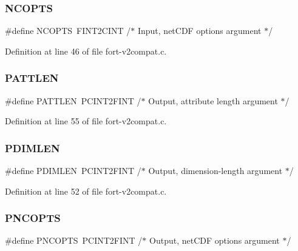\subsubsection{\texorpdfstring{N\+C\+O\+P\+TS}{NCOPTS}}
{\footnotesize\ttfamily \#define N\+C\+O\+P\+TS~F\+I\+N\+T2\+C\+I\+NT	/$\ast$ Input, net\+C\+DF options argument $\ast$/}



Definition at line 46 of file fort-\/v2compat.\+c.

\mbox{\label{fort-v2compat_8c_abba4da455082c98d8b81b6d70ff498de}} 
\subsubsection{\texorpdfstring{P\+A\+T\+T\+L\+EN}{PATTLEN}}
{\footnotesize\ttfamily \#define P\+A\+T\+T\+L\+EN~P\+C\+I\+N\+T2\+F\+I\+NT	/$\ast$ Output, attribute length argument $\ast$/}



Definition at line 55 of file fort-\/v2compat.\+c.

\mbox{\label{fort-v2compat_8c_a966419668dc6e6f3e34bc743e56397a6}} 
\subsubsection{\texorpdfstring{P\+D\+I\+M\+L\+EN}{PDIMLEN}}
{\footnotesize\ttfamily \#define P\+D\+I\+M\+L\+EN~P\+C\+I\+N\+T2\+F\+I\+NT	/$\ast$ Output, dimension-\/length argument $\ast$/}



Definition at line 52 of file fort-\/v2compat.\+c.

\mbox{\label{fort-v2compat_8c_ad28923cfdb7eaecc17fef3711c74befc}} 
\subsubsection{\texorpdfstring{P\+N\+C\+O\+P\+TS}{PNCOPTS}}
{\footnotesize\ttfamily \#define P\+N\+C\+O\+P\+TS~P\+C\+I\+N\+T2\+F\+I\+NT	/$\ast$ Output, net\+C\+DF options argument $\ast$/}



